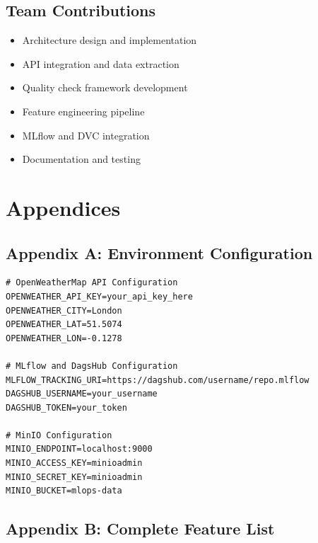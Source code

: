 \documentclass[12pt,a4paper]{article}
\begin{document}
\subsection{Team Contributions}

\begin{itemize}
    \item Architecture design and implementation
    \item API integration and data extraction
    \item Quality check framework development
    \item Feature engineering pipeline
    \item MLflow and DVC integration
    \item Documentation and testing
\end{itemize}

\section{Appendices}

\subsection{Appendix A: Environment Configuration}

\begin{lstlisting}[caption=.env Configuration File]
# OpenWeatherMap API Configuration
OPENWEATHER_API_KEY=your_api_key_here
OPENWEATHER_CITY=London
OPENWEATHER_LAT=51.5074
OPENWEATHER_LON=-0.1278

# MLflow and DagsHub Configuration
MLFLOW_TRACKING_URI=https://dagshub.com/username/repo.mlflow
DAGSHUB_USERNAME=your_username
DAGSHUB_TOKEN=your_token

# MinIO Configuration
MINIO_ENDPOINT=localhost:9000
MINIO_ACCESS_KEY=minioadmin
MINIO_SECRET_KEY=minioadmin
MINIO_BUCKET=mlops-data
\end{lstlisting}

\subsection{Appendix B: Complete Feature List}
\end{document}
